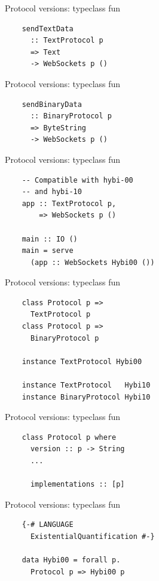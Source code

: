 \documentclass[20pt]{beamer}
\begin{document}
\begin{frame}[fragile]{Protocol versions: typeclass fun}
    \begin{lstlisting}
    sendTextData
      :: TextProtocol p
      => Text
      -> WebSockets p ()
    \end{lstlisting}
\end{frame}

\begin{frame}[fragile]{Protocol versions: typeclass fun}
    \begin{lstlisting}
    sendBinaryData
      :: BinaryProtocol p
      => ByteString
      -> WebSockets p ()
    \end{lstlisting}
\end{frame}

\begin{frame}[fragile]{Protocol versions: typeclass fun}
    \begin{lstlisting}
    -- Compatible with hybi-00
    -- and hybi-10
    app :: TextProtocol p,
        => WebSockets p ()

    main :: IO ()
    main = serve
      (app :: WebSockets Hybi00 ())
    \end{lstlisting}
\end{frame}

\begin{frame}[fragile]{Protocol versions: typeclass fun}
    \begin{lstlisting}
    class Protocol p =>
      TextProtocol p
    class Protocol p =>
      BinaryProtocol p

    instance TextProtocol Hybi00

    instance TextProtocol   Hybi10
    instance BinaryProtocol Hybi10
    \end{lstlisting}
\end{frame}

\begin{frame}[fragile]{Protocol versions: typeclass fun}
    \begin{lstlisting}
    class Protocol p where
      version :: p -> String
      ...

      implementations :: [p]
    \end{lstlisting}
\end{frame}

\begin{frame}[fragile]{Protocol versions: typeclass fun}
    \begin{lstlisting}
    {-# LANGUAGE
      ExistentialQuantification #-}

    data Hybi00 = forall p.
      Protocol p => Hybi00 p
    \end{lstlisting}
\end{frame}
\end{document}

